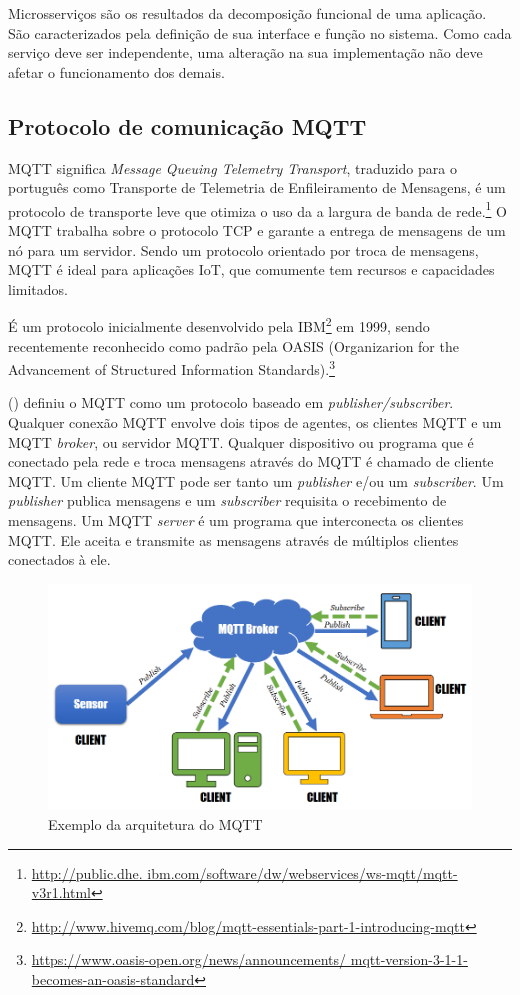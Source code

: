 Microsserviços são os resultados da decomposição funcional de uma aplicação. São caracterizados pela definição de sua interface e função no sistema. Como cada serviço deve ser independente, uma alteração na sua implementação não deve afetar o funcionamento dos demais. \cite{Pahl}

\subsection{Protocolo de comunicação MQTT}

MQTT significa \textit{Message Queuing Telemetry Transport}, traduzido para o português como Transporte de Telemetria de Enfileiramento de Mensagens, é um protocolo de transporte leve que otimiza o uso da a largura de banda de rede.\footnote{\url{http://public.dhe. ibm.com/software/dw/webservices/ws-mqtt/mqtt-v3r1.html}} O MQTT trabalha sobre o protocolo TCP e garante a entrega de mensagens de um nó para um servidor. Sendo um protocolo orientado por troca de mensagens, MQTT é ideal para aplicações IoT, que comumente tem recursos e capacidades limitados.

É um protocolo inicialmente desenvolvido pela IBM\footnote{\url{http://www.hivemq.com/blog/mqtt-essentials-part-1-introducing-mqtt}} em 1999, sendo recentemente reconhecido como padrão pela OASIS (Organizarion for the Advancement of Structured Information Standards).\footnote{\url{https://www.oasis-open.org/news/announcements/ mqtt-version-3-1-1-becomes-an-oasis-standard}}

\citeauthor{Kodali2017} (\citeyear{Kodali2017}) definiu o MQTT como um protocolo baseado em \textit {publisher/subscriber}. Qualquer conexão MQTT envolve dois tipos de agentes, os clientes MQTT e um MQTT \textit {broker}, ou servidor MQTT. Qualquer dispositivo ou programa que é conectado pela rede e troca mensagens através do MQTT é chamado de cliente MQTT. Um cliente MQTT pode ser tanto um \textit {publisher} e/ou um \textit {subscriber}. Um \textit {publisher} publica mensagens e um \textit {subscriber} requisita o recebimento de mensagens. Um MQTT \textit {server} é um programa que interconecta os clientes MQTT. Ele aceita e transmite as mensagens através de múltiplos clientes conectados à ele.

\begin{figure}[htbp]
	\centering
	\includegraphics[width=1\linewidth]{figuras/mqtt-architecture.png}
	\caption{Exemplo da arquitetura do MQTT}
	\label{fig:arquitetura-mqtt}
\end{figure}

